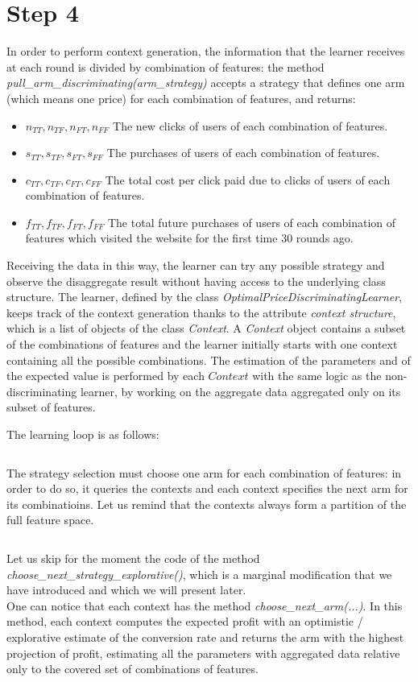 \documentclass[11pt]{article} %
\begin{document}
\section{Step 4}
In order to perform context generation, the information that the learner receives at each round is divided by combination of features: the method \textit{pull\_arm\_discriminating(arm\_strategy)} accepts a strategy that defines one arm (which means one price) for each combination of features, and returns:
\begin{itemize}
\item $n_{TT},n_{TF},n_{FT},n_{FF}$ The new clicks of users of each combination of features.
\item $s_{TT}, s_{TF},s_{FT},s_{FF}$ The purchases of users of each combination of features.
\item $c_{TT},c_{TF},c_{FT},c_{FF}$ The total cost per click paid due to clicks of users of each combination of features.
\item $f_{TT},f_{TF},f_{FT},f_{FF}$ The total future purchases of users of each combination of features which visited the website for the first time $30$ rounds ago.
\end{itemize}
Receiving the data in this way, the learner can try any possible strategy and observe the disaggregate result without having access to the underlying class structure.
The learner, defined by the class \textit{OptimalPriceDiscriminatingLearner}, keeps track of the context generation thanks to the attribute \textit{context structure}, which is a list of objects of the class \textit{Context}. A \textit{Context} object contains a subset of the combinations of features and the learner initially starts with one context containing all the possible combinations. The estimation of the parameters and of the expected value is performed by each $Context$ with the same logic as the non-discriminating learner, by working on the aggregate data aggregated only on its subset of features.

The learning loop is as follows:
\inputminted{python}{code/step4_learning_loop.py}

\begin{samepage}
The strategy selection must choose one arm for each combination of features: in order to do so, it queries the contexts and each context specifies the next arm for its combinatioins. Let us remind that the contexts always form a partition of the full feature space.
\inputminted{python}{code/step4_choose_next_strategy.py}
\end{samepage}
Let us skip for the moment the code of the method \textit{choose\_next\_strategy\_explorative()}, which is a marginal modification that we have introduced and which we will present later.\\
One can notice that each context has the method \textit{choose\_next\_arm(...)}. In this method, each context computes the expected profit with an optimistic / explorative estimate of the conversion rate and returns the arm with the highest projection of profit, estimating all the parameters with aggregated data relative only to the covered set of combinations of features.
\end{document}
